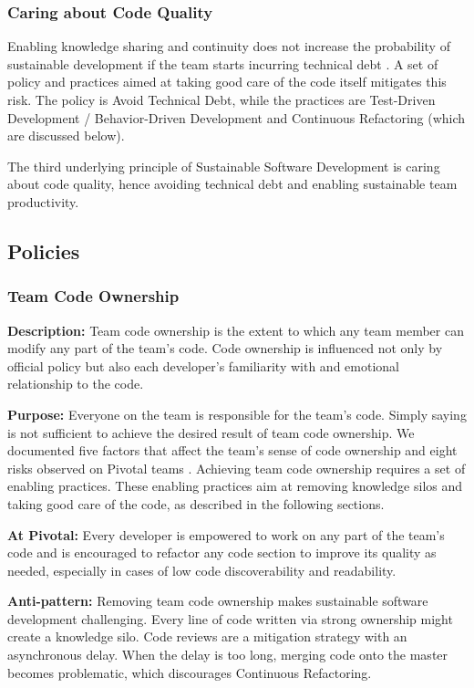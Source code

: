 \subsubsection{Caring about Code Quality}

Enabling knowledge sharing and continuity does not increase the probability of sustainable development if the team starts incurring technical debt \cite{McConnellTechnicalDebt}. A set of policy and practices aimed at taking good care of the code itself mitigates this risk. The policy is Avoid Technical Debt, while the practices are Test-Driven Development / Behavior-Driven Development and Continuous Refactoring (which are discussed below).

The third underlying principle of Sustainable Software Development is caring about code quality, hence avoiding technical debt and enabling sustainable team productivity.
\subsection{Policies}

\subsubsection{Team Code Ownership}

\textbf{Description:} Team code ownership is the extent to which any team member can modify any part of the team's code. Code ownership is influenced not only by official policy but also each developer's familiarity with and emotional relationship to the code.

\textbf{Purpose:} Everyone on the team is responsible for the team's code. Simply saying  is not sufficient to achieve the desired result of team code ownership. We documented five factors that affect the team's sense of code ownership and eight risks observed on Pivotal teams \cite{SedanoTeamCodeOwnership}. Achieving team code ownership requires a set of enabling practices. These enabling practices aim at removing knowledge silos and taking good care of the code, as described in the following sections.

\textbf{At Pivotal:} Every developer is empowered to work on any part of the team's code and is encouraged to refactor any code section to improve its quality as needed, especially in cases of low code discoverability and readability.

\textbf{Anti-pattern:} Removing team code ownership makes sustainable software development challenging. Every line of code written via strong ownership might create a knowledge silo. Code reviews are a mitigation strategy with an asynchronous delay. When the delay is too long, merging code onto the master becomes problematic, which discourages Continuous Refactoring. 

